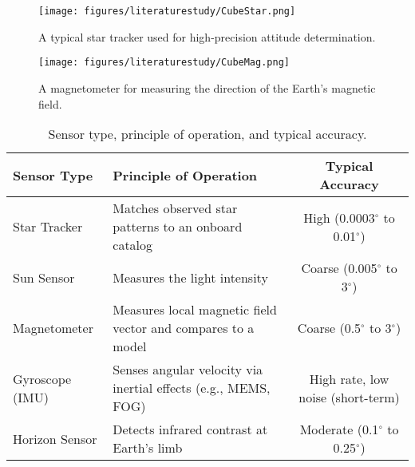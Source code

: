 \begin{figure}[H]
    \centering
    \begin{minipage}{0.4\textwidth}
        \centering
        \texttt{[image: figures/literaturestudy/CubeStar.png]}
        \caption{A typical star tracker used for high-precision attitude determination.\cite{CubeStar}}
        \label{fig:star_tracker}
    \end{minipage}\hfill
    \begin{minipage}{0.4\textwidth}
        \centering
        \texttt{[image: figures/literaturestudy/CubeMag.png]}
        \caption{A magnetometer for measuring the direction of the Earth's magnetic field.\cite{CubeMag}}
        \label{fig:magnetometer}
    \end{minipage}
\end{figure}

\begin{table}[H]
\centering
\renewcommand{\arraystretch}{1.15}
\begin{tabularx}{\textwidth}{@{} l >{\raggedright\arraybackslash}X c @{}}
\toprule
\textbf{Sensor Type} & \textbf{Principle of Operation} & \textbf{Typical Accuracy} \\
\midrule
Star Tracker      & Matches observed star patterns to an onboard catalog & High (0.0003$^\circ$ to 0.01$^\circ$) \\
Sun Sensor        & Measures the light intensity & Coarse (0.005$^\circ$ to 3$^\circ$) \\
Magnetometer      & Measures local magnetic field vector and compares to a model & Coarse (0.5$^\circ$ to 3$^\circ$) \\
Gyroscope (IMU)   & Senses angular velocity via inertial effects (e.g., MEMS, FOG) & High rate, low noise (short-term) \\
Horizon Sensor    & Detects infrared contrast at Earth's limb & Moderate (0.1$^\circ$ to 0.25$^\circ$) \\
\bottomrule
\end{tabularx}
\caption{Sensor type, principle of operation, and typical accuracy.}
\label{tab:sensors_operation_accuracy}
\end{table}

